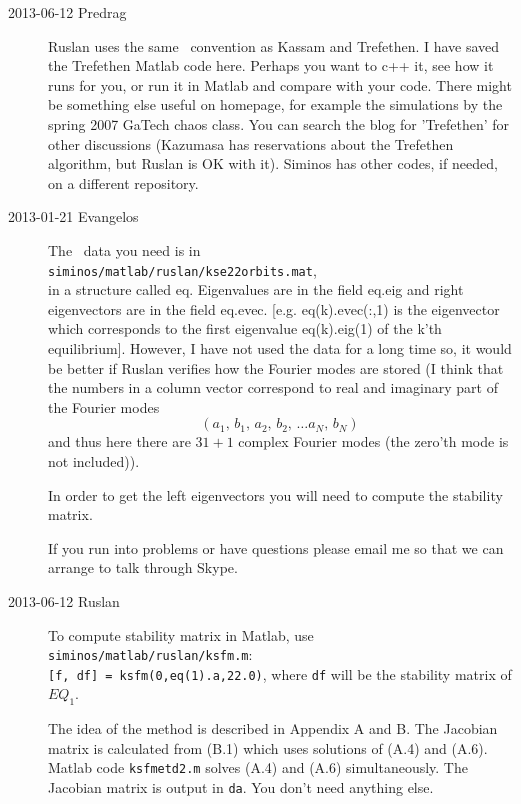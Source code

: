 \begin{description}
\item[2013-06-12 Predrag]
Ruslan uses the same \KSe\ convention as Kassam and
Trefethen. I have saved the Trefethen Matlab code
 {here}. Perhaps
you want to c++ it, see how it runs for you, or run it in Matlab and
compare with your code. There might be something else useful on
 homepage,
for example the simulations by the spring 2007 GaTech chaos class.
You can search the blog for 'Trefethen' for other discussions
(Kazumasa has reservations about the Trefethen algorithm,
but Ruslan is OK with it).
Siminos has other codes, if needed, on a different repository.

\item[2013-01-21 Evangelos] The \KS\ data you need is in \\
\texttt{siminos/matlab/ruslan/kse22orbits.mat},
\\
in a structure called eq.
Eigenvalues are in the field eq.eig and right eigenvectors are in the field eq.evec.
[e.g. eq(k).evec(:,1) is the eigenvector which corresponds to the first eigenvalue eq(k).eig(1)
of the k'th equilibrium]. However, I have not used the data for a long time so, it would
be better if Ruslan verifies how the Fourier modes are stored (I think that the numbers
in a column vector correspond to real and imaginary part of the Fourier modes
\[
 (a_1,\, b_1,\, a_2,\, b_2,\, \ldots a_N,\, b_N)
\]
and thus here there are $31+1$ complex Fourier modes (the zero'th mode is not included)).

In order to get the left eigenvectors you will need to compute the
stability matrix.

If you run into problems or have questions please email me so that we can arrange to talk through Skype.


\item[2013-06-12 Ruslan] To compute stability matrix in Matlab, use
\\
\texttt{siminos/matlab/ruslan/ksfm.m}:
\\ {\tt [f, df] = ksfm(0,eq(1).a,22.0)}, where {\tt df} will be the stability matrix of $EQ_1$.

The idea of the method is described in  Appendix A and
B.  The Jacobian matrix is calculated from (B.1) which uses solutions
of (A.4) and (A.6).  Matlab code {\tt ksfmetd2.m} solves (A.4) and
(A.6) simultaneously.  The Jacobian matrix is output in {\tt da}.
You don't need anything else.


\end{description}
